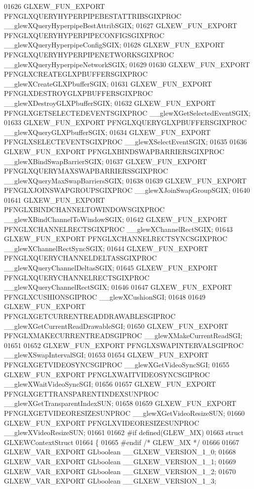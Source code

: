 \begin{DoxyCode}
01626 GLXEW_FUN_EXPORT PFNGLXQUERYHYPERPIPEBESTATTRIBSGIXPROC 
      __glewXQueryHyperpipeBestAttribSGIX;
01627 GLXEW_FUN_EXPORT PFNGLXQUERYHYPERPIPECONFIGSGIXPROC 
      __glewXQueryHyperpipeConfigSGIX;
01628 GLXEW_FUN_EXPORT PFNGLXQUERYHYPERPIPENETWORKSGIXPROC 
      __glewXQueryHyperpipeNetworkSGIX;
01629 
01630 GLXEW_FUN_EXPORT PFNGLXCREATEGLXPBUFFERSGIXPROC __glewXCreateGLXPbufferSGIX;
01631 GLXEW_FUN_EXPORT PFNGLXDESTROYGLXPBUFFERSGIXPROC __glewXDestroyGLXPbufferSGIX;
01632 GLXEW_FUN_EXPORT PFNGLXGETSELECTEDEVENTSGIXPROC __glewXGetSelectedEventSGIX;
01633 GLXEW_FUN_EXPORT PFNGLXQUERYGLXPBUFFERSGIXPROC __glewXQueryGLXPbufferSGIX;
01634 GLXEW_FUN_EXPORT PFNGLXSELECTEVENTSGIXPROC __glewXSelectEventSGIX;
01635 
01636 GLXEW_FUN_EXPORT PFNGLXBINDSWAPBARRIERSGIXPROC __glewXBindSwapBarrierSGIX;
01637 GLXEW_FUN_EXPORT PFNGLXQUERYMAXSWAPBARRIERSSGIXPROC 
      __glewXQueryMaxSwapBarriersSGIX;
01638 
01639 GLXEW_FUN_EXPORT PFNGLXJOINSWAPGROUPSGIXPROC __glewXJoinSwapGroupSGIX;
01640 
01641 GLXEW_FUN_EXPORT PFNGLXBINDCHANNELTOWINDOWSGIXPROC 
      __glewXBindChannelToWindowSGIX;
01642 GLXEW_FUN_EXPORT PFNGLXCHANNELRECTSGIXPROC __glewXChannelRectSGIX;
01643 GLXEW_FUN_EXPORT PFNGLXCHANNELRECTSYNCSGIXPROC __glewXChannelRectSyncSGIX;
01644 GLXEW_FUN_EXPORT PFNGLXQUERYCHANNELDELTASSGIXPROC __glewXQueryChannelDeltasSGIX;
01645 GLXEW_FUN_EXPORT PFNGLXQUERYCHANNELRECTSGIXPROC __glewXQueryChannelRectSGIX;
01646 
01647 GLXEW_FUN_EXPORT PFNGLXCUSHIONSGIPROC __glewXCushionSGI;
01648 
01649 GLXEW_FUN_EXPORT PFNGLXGETCURRENTREADDRAWABLESGIPROC 
      __glewXGetCurrentReadDrawableSGI;
01650 GLXEW_FUN_EXPORT PFNGLXMAKECURRENTREADSGIPROC __glewXMakeCurrentReadSGI;
01651 
01652 GLXEW_FUN_EXPORT PFNGLXSWAPINTERVALSGIPROC __glewXSwapIntervalSGI;
01653 
01654 GLXEW_FUN_EXPORT PFNGLXGETVIDEOSYNCSGIPROC __glewXGetVideoSyncSGI;
01655 GLXEW_FUN_EXPORT PFNGLXWAITVIDEOSYNCSGIPROC __glewXWaitVideoSyncSGI;
01656 
01657 GLXEW_FUN_EXPORT PFNGLXGETTRANSPARENTINDEXSUNPROC __glewXGetTransparentIndexSUN;
01658 
01659 GLXEW_FUN_EXPORT PFNGLXGETVIDEORESIZESUNPROC __glewXGetVideoResizeSUN;
01660 GLXEW_FUN_EXPORT PFNGLXVIDEORESIZESUNPROC __glewXVideoResizeSUN;
01661 
01662 \textcolor{preprocessor}{#if defined(GLEW\_MX)}
01663 \textcolor{keyword}{struct }GLXEWContextStruct
01664 \{
01665 \textcolor{preprocessor}{#endif }\textcolor{comment}{/* GLEW\_MX */}\textcolor{preprocessor}{}
01666 
01667 GLXEW_VAR_EXPORT GLboolean __GLXEW_VERSION_1_0;
01668 GLXEW_VAR_EXPORT GLboolean __GLXEW_VERSION_1_1;
01669 GLXEW_VAR_EXPORT GLboolean __GLXEW_VERSION_1_2;
01670 GLXEW_VAR_EXPORT GLboolean __GLXEW_VERSION_1_3;

\end{DoxyCode}
